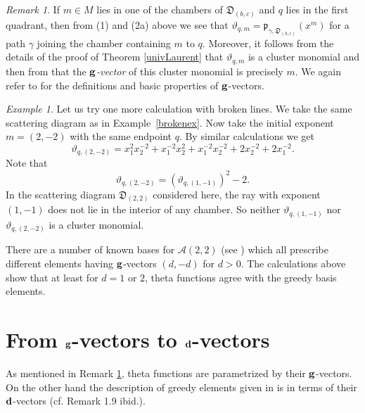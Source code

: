 \documentclass[11pt]{amsart}
\newcommand{\saySS}[1]{\say[SS]{#1}}
\newcommand{\sayMG}[1]{\say[MG]{#1}}
\theoremstyle{remark}
\newtheorem{example}[theorem]{Example}
\newtheorem{remark}[theorem]{Remark}
\numberwithin{equation}{section}
\newcommand{\cA}{\mathcal{A}}
\newcommand{\fD}{\mathfrak{D}}
\newcommand{\fp}{\mathfrak{p}}
\newcommand{\bfd}{{\bf d}}
\newcommand{\bfg}{{\bf g}}
\begin{document}
\begin{remark} 
  \label{rk:theta functions g-vector}
  If $m\in M$ lies in one of the chambers of $\fD_{(b,c)}$ and $q$ lies in
  the first quadrant, then from (1) and (2a) above we see that
  $\vartheta_{q,m}=\fp_{\gamma,\fD_{(b,c)}}(x^{m})$ for a path $\gamma$
  joining the chamber containing $m$ to $q$. Moreover, it follows from the
  details of the proof of Theorem \ref{univLaurent} that $\vartheta_{q,m}$ is
  a cluster monomial and then from \cite[Theorem~7.5]{GHKK} that the 
  \emph{$\bfg$-vector} of this cluster monomial is precisely $m$. We again refer to
  \cite{FZ4} for the definitions and basic properties of $\bfg$-vectors.
\end{remark}

\begin{example}
  Let us try one more calculation with broken lines. We take the same scattering
  diagram as in Example~\ref{brokenex}. Now take the initial exponent $m=(2,-2)$
  with the same endpoint $q$. By similar calculations we get 
  \[ 
    \vartheta _{q, (2,-2)} = 
    x_1^2 x_2^{-2} + x_1^{-2}x_2^2 + x_1^{-2}x_2^{-2} + 2 x_2^{-2} + 2x_1^{-2}.  
  \]
  Note that 
  \[ 
    \vartheta _{q, (2,-2)} = 
    \left(\vartheta_{q, (1,-1)}\right) ^2 -2. 
  \]
  In the scattering diagram $\fD_{(2,2)}$ considered here, the ray with exponent $(1,-1)$ does
  not lie in the interior of any chamber. So neither $\vartheta_{q,(1,-1)}$ nor 
  $\vartheta _{q, (2,-2)}$ is a cluster monomial.

  There are a number of known bases for $\cA(2,2)$ (see \cite{Dup,MSW,LLZ}) which all prescribe different elements
  having $\bfg$-vectors $(d,-d)$ for $d>0$. The
  calculations above show that at least for $d=1$ or $2$, theta functions agree with
  the greedy basis elements.
\end{example}


\section{From $\bfg$-vectors to $\bfd$-vectors}
As mentioned in Remark \ref{rk:theta functions g-vector}, theta functions are
parametrized by their $\bfg$-vectors. On the other hand the description of
greedy elements given in \cite{LLZ} is in terms of their $\bfd$-vectors (cf.
Remark 1.9 ibid.). 
\end{document}
